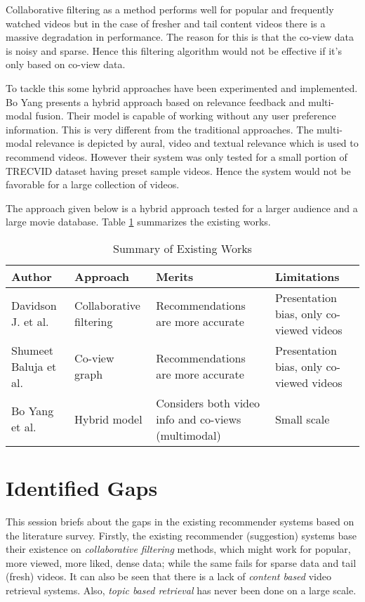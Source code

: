 Collaborative filtering as a method performs well for popular and frequently watched videos but in the case of fresher and tail content videos there is a massive degradation in performance. The reason for this is that the co-view data is noisy and sparse. Hence this filtering algorithm would not be effective if it’s only based on co-view data.\par
To tackle this some hybrid approaches have been experimented and implemented. Bo Yang \cite{yang2007} presents a hybrid approach based on relevance feedback and multi-modal fusion. Their model is capable of working without any user preference information. This is very different from the traditional approaches. The multi-modal relevance is depicted by aural, video and textual relevance which is used to recommend videos. However their system was only tested for a small portion of TRECVID dataset having preset sample videos. Hence the system would not be favorable for a large collection of videos.\par
The approach given below is a hybrid approach tested for a larger audience and a large movie database. Table \ref{tab:1} summarizes the existing works.

\begin{table}[h]
  \centering
  \bgroup
  \def\arraystretch{1.5}
  \caption{Summary of Existing Works}
  \label{tab:1}
  \begin{tabular}{>{\raggedright}p{2.4cm}>{\raggedright}p{3cm}>{\raggedright}p{4cm}>{\raggedright}p{4cm}} 
    \toprule
    \textbf{Author} & \textbf{Approach} & \textbf{Merits} & \textbf{Limitations} \tabularnewline
    \midrule
     Davidson J. et al. \cite{davison2010} & Collaborative filtering & Recommendations are more accurate & Presentation bias, only co-viewed videos 
 \tabularnewline
     Shumeet Baluja et al. \cite{baluja2008} & Co-view graph & Recommendations are more accurate & Presentation bias, only co-viewed videos \tabularnewline
     Bo Yang et al. \cite{yang2007} & Hybrid model & Considers both video info and co-views (multimodal) & Small scale \tabularnewline
    \bottomrule
  \end{tabular}
  \egroup
\end{table}

\section{Identified Gaps}
This session briefs about the gaps in the existing recommender systems based on the literature survey. Firstly, the existing recommender (suggestion) systems base their existence on \textit{collaborative filtering} methods, which might work for popular, more viewed, more liked, dense data; while the same fails for sparse data and tail (fresh) videos. It can also be seen that there is a lack of \textit{content based} video retrieval systems. Also, \textit{topic based retrieval} has never been done on a large scale.

